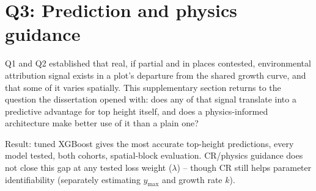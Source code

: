\documentclass[logo,msc,ai]{infthesis}           %
\begin{document}
\section{Q3: Prediction and physics guidance}
\label{sec:results-q3}

Q1 and Q2 established that real, if partial and in places contested, environmental
attribution signal exists in a plot's departure from the shared growth curve, and that some
of it varies spatially. This supplementary section returns to the question the dissertation
opened with: does any of that signal translate into a predictive advantage for top height
itself, and does a physics-informed architecture make better use of it than a plain one?

Result: tuned XGBoost gives the most accurate top-height predictions, every model
tested, both cohorts, spatial-block evaluation. CR/physics guidance does not close
this gap at any tested loss weight ($\lambda$) -- though CR still helps parameter
identifiability (separately estimating $y_{\max}$ and growth rate $k$).
\end{document}
